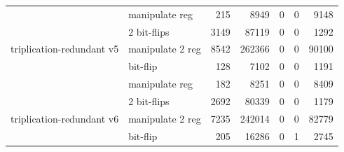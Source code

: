 \begin{table}
\begin{tabular}{llrrrrr}
                                              & manipulate reg   & 215                                               & 8949                                                   & 0 & 0                                                  & 9148                                                \\
                                              & 2 bit-flips        & 3149                                              & 87119                                                  & 0 & 0                                                  & 1292                                                \\
\multirow{-4}{*}{triplication-redundant v5} & manipulate 2 reg & 8542                                              & 262366                                                 & 0 & 0                                                  & 90100                                               \\
\hline
                                              & bit-flip          & 128                                               & 7102                                                   & 0 & 0                                                  & 1191                                                \\
                                              & manipulate reg   & 182                                               & 8251                                                   & 0 & 0                                                  & 8409                                                \\
                                              & 2 bit-flips        & 2692                                              & 80339                                                  & 0 & 0                                                  & 1179                                                \\
\multirow{-4}{*}{triplication-redundant v6} & manipulate 2 reg & 7235                                              & 242014                                                 & 0  & 0                                                 & 82779                                               \\
\hline
                                              & bit-flip          & 205                                               & 16286                                                  & 0 & 1                                                  & 2745                                                \\

\end{tabular}
\end{table}
